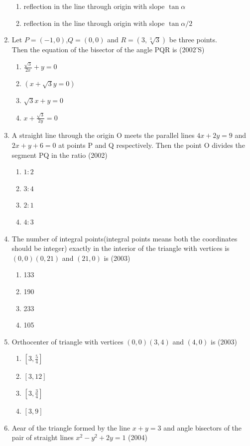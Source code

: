 \documentclass[12pt]{article}
\begin{document}
\begin{enumerate}
\begin{enumerate}
\item reflection in the line through origin with slope $\tan\alpha$
\item reflection in the line through origin with slope $\tan\alpha/2$
\end{enumerate}
\item Let $P=(-1,0)$,$Q=(0,0)$ and $R=(3,\sqrt[3]{3})$ be three points.\\
Then the equation of the bisector of the angle PQR is (2002'S)
\begin{enumerate}
\item $\frac{\sqrt{3}}{2x}+y=0$ 
\item $(x+\sqrt{3}y=0)$
\item $\sqrt{3}x+y=0$ 
\item $x+\frac{\sqrt{3}}{2y}=0$
\end{enumerate}
\item A straight line through the origin O meets the parallel lines $4x+2y=9$ and $2x+y+6=0$ at points P and Q respectively. Then the point O divides the segment PQ in the ratio (2002)
\begin{enumerate}
\item $1:2$   
\item $3:4$
\item $2:1$ 
\item $4:3$ 
\end{enumerate}
\item The number of integral points(integral points means both the coordinates should be integer) exactly in the interior of the triangle with vertices is $(0,0)(0,21)$ and $(21,0)$ is (2003)
\begin{enumerate}
\item 133  
\item 190  
\item 233 
\item 105
\end{enumerate}
\item Orthocenter of triangle with vertices $(0,0)(3,4)$ and $(4,0)$ is  (2003)
\begin{enumerate}
\item $[3,\frac{5}{4}]$ 
\item $[3,12]$   
\item $[3,\frac{3}{4}]$ 
\item $[3,9]$
\end{enumerate}
\item Aear of the triangle formed by the line $x+y=3$ and angle bisectors of the pair of straight lines $x^2-y^2+2y=1$ (2004)

\end{enumerate}
\end{document}
